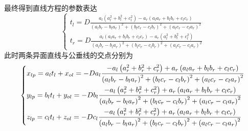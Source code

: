 最终得到直线方程的参数表达
\begin{equation}
\left\{
\begin{aligned}
t_l=D \frac{\displaystyle a_l (a_l^2 + b_l^2 + c_l^2) - a_r (a_la_r + b_lb_r + c_lc_r)}{\displaystyle (a_lb_r-b_la_r)^2 + (b_lc_r-c_lb_r)^2 + (a_lc_r-c_la_r)^2} \\
t_r=D \frac{\displaystyle a_l(a_la_r + b_lb_r + c_lc_r)  - a_r (a_l^2 + b_l^2 + c_l^2)}{\displaystyle (a_lb_r-b_la_r)^2 + (b_lc_r-c_lb_r)^2 + (a_lc_r-c_la_r)^2}
\end{aligned}
\right.
\end{equation}
此时两条异面直线与公垂线的交点分别为
\begin{equation}
\left\{ \begin{gathered}
{x_{lp}} = {a_l}{t_l} + {x_{ol}} =  - D{a_l}\frac{{ - {a_l}\left( {a_r^2 + b_r^2 + c_r^2} \right) + {a_r}\left( {{a_l}{a_r} + {b_l}{b_r} + {c_l}{c_r}} \right)}}{{{{\left( {{a_l}{b_r} - {b_l}{a_r}} \right)}^2} + {{\left( {{b_l}{c_r} - {c_l}{b_r}} \right)}^2} + {{\left( {{a_l}{c_r} - {c_l}{a_r}} \right)}^2}}} \hfill \\
{y_{lp}} = {b_l}{t_l} + {y_{ol}} =  - D{b_l}\frac{{ - {a_l}\left( {a_r^2 + b_r^2 + c_r^2} \right) + {a_r}\left( {{a_l}{a_r} + {b_l}{b_r} + {c_l}{c_r}} \right)}}{{{{\left( {{a_l}{b_r} - {b_l}{a_r}} \right)}^2} + {{\left( {{b_l}{c_r} - {c_l}{b_r}} \right)}^2} + {{\left( {{a_l}{c_r} - {c_l}{a_r}} \right)}^2}}} \hfill \\
{z_{lp}} = {c_l}{t_l} + {z_{ol}} =  - D{c_l}\frac{{ - {a_l}\left( {a_r^2 + b_r^2 + c_r^2} \right) + {a_r}\left( {{a_l}{a_r} + {b_l}{b_r} + {c_l}{c_r}} \right)}}{{{{\left( {{a_l}{b_r} - {b_l}{a_r}} \right)}^2} + {{\left( {{b_l}{c_r} - {c_l}{b_r}} \right)}^2} + {{\left( {{a_l}{c_r} - {c_l}{a_r}} \right)}^2}}} \hfill \\ 
\end{gathered}  \right.
\end{equation}

